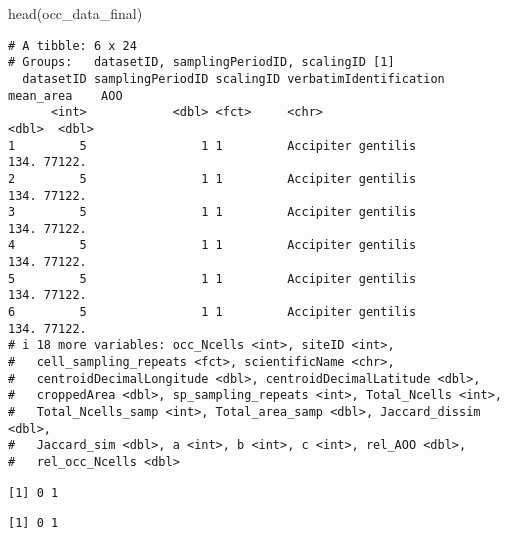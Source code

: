 \documentclass[
  letterpaper,
  DIV=11,
  numbers=noendperiod]{scrreprt}
\newenvironment{Shaded}{\begin{snugshade}}{\end{snugshade}}
\newcommand{\DecValTok}[1]{\textcolor[rgb]{0.68,0.00,0.00}{#1}}
\newcommand{\FunctionTok}[1]{\textcolor[rgb]{0.28,0.35,0.67}{#1}}
\newcommand{\NormalTok}[1]{\textcolor[rgb]{0.00,0.23,0.31}{#1}}
\newcommand{\SpecialCharTok}[1]{\textcolor[rgb]{0.37,0.37,0.37}{#1}}
\begin{document}
\begin{Shaded}
\begin{Highlighting}[]
\FunctionTok{head}\NormalTok{(occ\_data\_final)}
\end{Highlighting}
\end{Shaded}

\begin{verbatim}
# A tibble: 6 x 24
# Groups:   datasetID, samplingPeriodID, scalingID [1]
  datasetID samplingPeriodID scalingID verbatimIdentification mean_area    AOO
      <int>            <dbl> <fct>     <chr>                      <dbl>  <dbl>
1         5                1 1         Accipiter gentilis          134. 77122.
2         5                1 1         Accipiter gentilis          134. 77122.
3         5                1 1         Accipiter gentilis          134. 77122.
4         5                1 1         Accipiter gentilis          134. 77122.
5         5                1 1         Accipiter gentilis          134. 77122.
6         5                1 1         Accipiter gentilis          134. 77122.
# i 18 more variables: occ_Ncells <int>, siteID <int>,
#   cell_sampling_repeats <fct>, scientificName <chr>,
#   centroidDecimalLongitude <dbl>, centroidDecimalLatitude <dbl>,
#   croppedArea <dbl>, sp_sampling_repeats <int>, Total_Ncells <int>,
#   Total_Ncells_samp <int>, Total_area_samp <dbl>, Jaccard_dissim <dbl>,
#   Jaccard_sim <dbl>, a <int>, b <int>, c <int>, rel_AOO <dbl>,
#   rel_occ_Ncells <dbl>
\end{verbatim}

\begin{Shaded}
\end{Shaded}

\begin{verbatim}
[1] 0 1
\end{verbatim}

\begin{Shaded}
\end{Shaded}

\begin{verbatim}
[1] 0 1
\end{verbatim}
\end{document}
